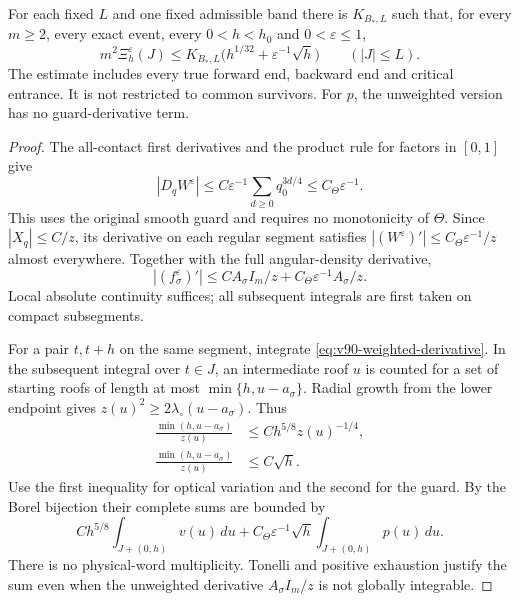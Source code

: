 \begin{theorem}
\label{thm:v90-whole-oscillation}
For each fixed $L$ and one fixed admissible band there is $K_{B_*,L}$
such that, for every $m\ge2$, every exact event, every $0<h<h_0$ and
$0<\varepsilon\le1$,
\begin{equation}\label{eq:v90-whole-oscillation}
 m^2\Xi_h^\varepsilon(J)
       \le K_{B_*,L}\bigl(h^{1/32}+\varepsilon^{-1}\sqrt h\bigr)
                         \qquad(|J|\le L).
\end{equation}
The estimate includes every true forward end, backward end and
critical entrance. It is not restricted to common survivors.
For $p$, the unweighted version has no guard-derivative term.
\end{theorem}
\begin{proof}
The all-contact first derivatives and the product rule for factors in
$[0,1]$ give
\[
 |D_qW^\varepsilon|\le
 C\varepsilon^{-1}\sum_{d\ge0}q_0^{3d/4}
 \le C_\Theta\varepsilon^{-1}.
\]
This uses the original smooth guard and requires no monotonicity of
$\Theta$. Since $|X_q|\le C/z$, its derivative on each regular
segment satisfies $|(W^\varepsilon)'|\le C_\Theta\varepsilon^{-1}/z$
almost everywhere. Together with the full angular-density derivative,
\begin{equation}\label{eq:v90-weighted-derivative}
 |(f_\sigma^\varepsilon)'|
       \le C A_\sigma I_m/z+C_\Theta\varepsilon^{-1}A_\sigma/z.
\end{equation}
Local absolute continuity suffices; all subsequent integrals are
first taken on compact subsegments.

For a pair $t,t+h$ on the same segment, integrate
\eqref{eq:v90-weighted-derivative}. In the subsequent integral over
$t\in J$, an intermediate roof $u$ is counted for a set of starting
roofs of length at most $\min\{h,u-a_\sigma\}$. Radial growth from
the lower endpoint gives $z(u)^2\ge2\lambda_\circ(u-a_\sigma)$.
Thus
\begin{align*}
 \frac{\min(h,u-a_\sigma)}{z(u)}
     &\le C h^{5/8}z(u)^{-1/4},\\
 \frac{\min(h,u-a_\sigma)}{z(u)}&\le C\sqrt h.
\end{align*}
Use the first inequality for optical variation and the second for
the guard. By the Borel bijection their complete sums are bounded by
\[
 C h^{5/8}\int_{J+(0,h)}v(u)\,du
        +C_\Theta\varepsilon^{-1}\sqrt h\int_{J+(0,h)}p(u)\,du.
\]
There is no physical-word multiplicity. Tonelli and positive
exhaustion justify the sum even when the unweighted derivative
$A_\sigma I_m/z$ is not globally integrable.


\end{proof}
